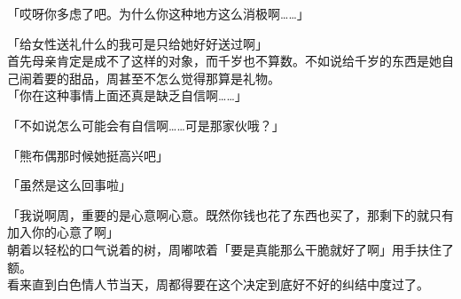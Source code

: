 「哎呀你多虑了吧。为什么你这种地方这么消极啊……」

「给女性送礼什么的我可是只给她好好送过啊」\\

首先母亲肯定是成不了这样的对象，而千岁也不算数。不如说给千岁的东西是她自己闹着要的甜品，周甚至不怎么觉得那算是礼物。\\

「你在这种事情上面还真是缺乏自信啊……」

「不如说怎么可能会有自信啊……可是那家伙哦？」

「熊布偶那时候她挺高兴吧」

「虽然是这么回事啦」

「我说啊周，重要的是心意啊心意。既然你钱也花了东西也买了，那剩下的就只有加入你的心意了啊」\\

朝着以轻松的口气说着的树，周嘟哝着「要是真能那么干脆就好了啊」用手扶住了额。\\

看来直到白色情人节当天，周都得要在这个决定到底好不好的纠结中度过了。
